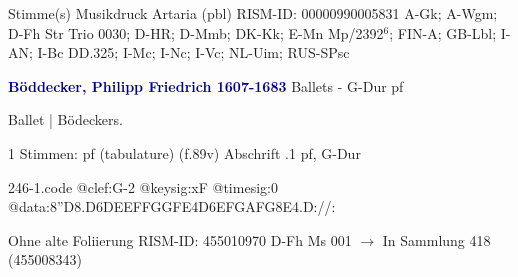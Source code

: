 \documentclass[twocolumn]{book}
\begin{document}
\newline \textcolor{darkblue}{}  Stimme(s)
\newline Musikdruck
\newline Artaria  (pbl)
\newline RISM-ID: 00000990005831
\newline A-Gk; A-Wgm; D-Fh  Str Trio 0030; D-HR; D-Mmb; DK-Kk; E-Mn  Mp/2392$^6$; FIN-A; GB-Lbl; I-AN; I-Bc  DD.325; I-Mc; I-Nc; I-Vc; NL-Uim; RUS-SPsc
\newline \par \vspace{7pt} \textcolor{darkblue}{\textbf{Böddecker, Philipp Friedrich  1607-1683}}
\newline Ballets - G-Dur
\newline pf
\newline \begin{itshape}[f.89v, at left:] Ballet | Bödeckers.\end{itshape} 
\newline \textcolor{darkblue}{}  1 Stimmen: pf (tabulature)  (f.89v)
\newline Abschrift
.1  pf, G-Dur  
\begin{filecontents*}{246-1.code}
@clef:G-2
@keysig:xF
@timesig:0
@data:8''D{8.D6D}{EEFF}{GGFE}4D{6EFGA}{FG8E}4.D://:
\end{filecontents*}
\newline
%
\newline Ohne alte Foliierung
\newline RISM-ID: 455010970
\newline D-Fh  Ms 001
\newline $\rightarrow$ In Sammlung 418 (455008343)
      
\end{document}
